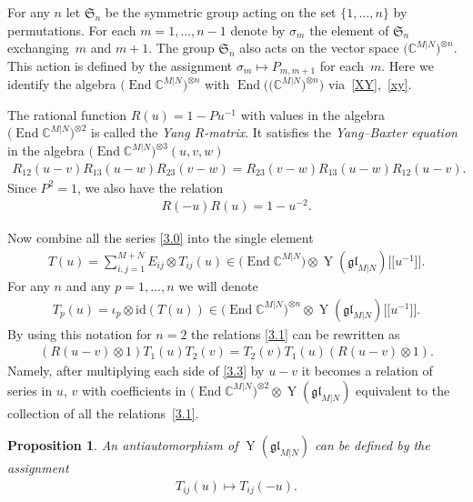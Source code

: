 \documentclass[pdftex]{sigma}
\numberwithin{equation}{section}
\newtheorem{Proposition}[Theorem]{Proposition}
\def\1{^{-1}}
\def\CC{{\mathbb{C}}}
\def\CMN{\CC^{M|N}}
\def\End{\operatorname{End}}
\def\glMN{\mathfrak{gl}_{M|N}}
\def\id{{\mathrm{id}}}
\def\ot{\otimes}
\def\si{\sigma}
\def\Sym{\mathfrak{S}}
\def\YMN{\operatorname{Y}(\glMN)}
\begin{document}
For any $n$ let $\Sym_n$ be the symmetric group acting
on the set $\{1,\dots, n\}$ by permutations. For each $m=1,\dots, n-1$
denote by $\si_m$ the element of $\Sym_n$ exchanging~$m$ and $m+1 $.
The group $\Sym_n$ also acts on the vector space $\big(\CMN\big)^{\ot n}$.
This action is defined by the assignment
$\si_m\mapsto P_{m,m+1}$ for each~$m $.
Here we identify the algebra
$\big(\End\CMN\big)^{\ot n}$ with $\End\big(\big(\CMN\big)^{\ot n}\big)$ via~\eqref{XY},~\eqref{xy}.

The rational function $R(u)=1-P u\1$ with values in the algebra
$\big(\End\CMN\big)^{\ot 2}$ is called the {\it Yang $R$-matrix}.
It satisfies the {\it Yang--Baxter equation}
in the algebra $\big(\End\CMN\big)^{\ot 3}(u,v,w)$
\begin{gather}\label{3.6}
R_{12}(u-v) R_{13}(u-w) R_{23}(v-w)=R_{23}(v-w) R_{13}(u-w) R_{12}(u-v) .
\end{gather}
Since $P^2=1 $, we also have the relation
\begin{gather}\label{3.52}
R(-u) R(u)=1-u^{-2} .
\end{gather}

Now combine all the series \eqref{3.0} into the single element
\begin{gather}\label{tu}
T(u)=\sum_{i,j=1}^{M+N} E_{ij}\ot T_{ij}(u)
\in\big(\End\CMN\big)\ot\YMN \big[\big[u^{-1}\big]\big] .
\end{gather}
For any $n$ and any $p=1,\dots, n$ we will denote
\begin{gather}
T_p(u)=\iota_p\ot\id ( T(u)) \in\big(\End\CMN\big)^{\ot n}\ot\YMN \big[\big[u\1\big]\big] .\label{3.22}
\end{gather}
By using this notation for $n=2$
the relations \eqref{3.1} can be rewritten as
\begin{gather}\label{3.3}
(R (u-v)\ot1) T_1(u) T_2(v)=T_2(v) T_1(u) (R (u-v)\ot1) .
\end{gather}
Namely, after multiplying each side of \eqref{3.3} by $u-v$ it becomes
a relation of series in $u$, $v$ with coefficients in %
$\big(\End\CMN\big)^{\ot 2}\ot\YMN$
equivalent to the collection of all the relations~\eqref{3.1}.

\begin{Proposition}\label{m}
An antiautomorphism of $\YMN$ can be defined by the assignment
\begin{gather}\label{M}
T_{ij}(u)\mapsto T_{ij}(-u) .
\end{gather}
\end{Proposition}
\end{document}
